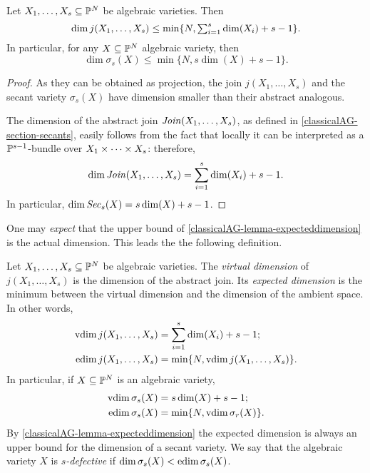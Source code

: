 \begin{lemma}
\label{classicalAG-lemma-expecteddimension}
Let $X_1, \ldots , X_s \subseteq \mathbb{P}^N$ be algebraic varieties. Then 
\[
    \dim j(X_1, \ldots , X_s) \leq \min\{ N, \textstyle\sum_{i=1}^s \dim(X_i) + s-1\}.
\]
In particular, for any $X \subseteq \mathbb{P}^N$ algebraic variety, then 
\[
    \dim \sigma_s(X) \leq \min\{ N , s\dim(X) + s - 1\}.
\]
\end{lemma}
\begin{proof}
As they can be obtained as projection, the join $j(X_1,\ldots,X_s)$ and the secant variety $\sigma_s(X)$ have dimension smaller than their abstract analogous.

The dimension of the abstract join $\mathit{Join}(X_1,\ldots,X_s)$, as defined in \ref{classicalAG-section-secants}, easily follows from the fact that locally it can be interpreted as a $\mathbb{P}^{s-1}$-bundle over $X_1 \times \cdots \times X_s$: therefore, 
    \[
        \dim \mathit{Join}(X_1,\ldots,X_s) = \sum_{i=1}^s \dim(X_i) + s-1.
    \]
    In particular, $\dim \mathit{Sec}_s(X) = s\dim(X) + s-1$.
\end{proof}
One may {\it expect} that the upper bound of \ref{classicalAG-lemma-expecteddimension} is the actual dimension. This leads the the following definition. 
\begin{definition}
\label{classicalAG-definition-expecteddimension}
    Let $X_1, \ldots , X_s \subseteq \mathbb{P}^N$ be algebraic varieties. The {\it virtual dimension} of $j(X_1,\ldots,X_s)$ is the dimension of the abstract join. Its {\it expected dimension} is the minimum between the virtual dimension and the dimension of the ambient space. In other words,
    \begin{align*}
        \operatorname{vdim} j(X_1,\ldots,X_s) & = \sum_{i=1}^s \dim(X_i) + s-1; \\ 
        \operatorname{edim} j(X_1,\ldots,X_s) & = \min \{N,\operatorname{vdim} j(X_1,\ldots,X_s)\}.
    \end{align*}
    In particular, if $X \subseteq \mathbb{P}^N$ is an algebraic variety, 
    \begin{align*}
        \operatorname{vdim} \sigma_s(X) & = s\dim(X) + s-1; \\ 
        \operatorname{edim} \sigma_s(X) & = \min \{N,\operatorname{vdim} \sigma_r(X)\}.
    \end{align*}
By \ref{classicalAG-lemma-expecteddimension} the expected dimension is always an upper bound for the dimension of a secant variety. We say that the algebraic variety $X$ is \emph{$s$-defective} if $\dim \sigma_s(X) < \operatorname{edim}\sigma_s(X)$. 
\end{definition}

